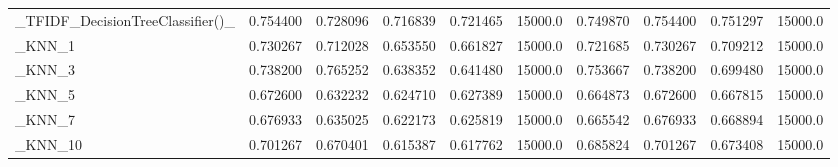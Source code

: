 \begin{tabular}{lrrrrrrrrr}
\_TFIDF\_DecisionTreeClassifier()\_                   &  0.754400 &         0.728096 &      0.716839 &        0.721465 &        15000.0 &            0.749870 &         0.754400 &           0.751297 &           15000.0 \\
\_KNN\_1                                             &  0.730267 &         0.712028 &      0.653550 &        0.661827 &        15000.0 &            0.721685 &         0.730267 &           0.709212 &           15000.0 \\
\_KNN\_3                                             &  0.738200 &         0.765252 &      0.638352 &        0.641480 &        15000.0 &            0.753667 &         0.738200 &           0.699480 &           15000.0 \\
\_KNN\_5                                             &  0.672600 &         0.632232 &      0.624710 &        0.627389 &        15000.0 &            0.664873 &         0.672600 &           0.667815 &           15000.0 \\
\_KNN\_7                                             &  0.676933 &         0.635025 &      0.622173 &        0.625819 &        15000.0 &            0.665542 &         0.676933 &           0.668894 &           15000.0 \\
\_KNN\_10                                            &  0.701267 &         0.670401 &      0.615387 &        0.617762 &        15000.0 &            0.685824 &         0.701267 &           0.673408 &           15000.0 \\
\bottomrule
\end{tabular}
